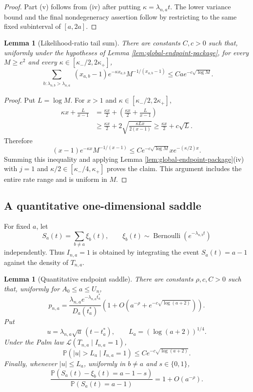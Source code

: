 \documentclass[11pt]{article}
\newtheorem{lemma}[theorem]{Lemma}
\theoremstyle{remark}
\newcommand{\Pp}{\mathbb P}
\begin{document}
\begin{proof}
Part (v) follows from (iv) after putting $\kappa=\lambda_{n,a}t$.  The lower
variance bound and the final nondegeneracy assertion follow by restricting to
the same fixed subinterval of $[a,2a]$.
\end{proof}

\begin{lemma}[Likelihood-ratio tail sum]\label{lem:global-likelihood-tail}
There are constants $C,c>0$ such that, uniformly under the hypotheses of Lemma
\ref{lem:global-endpoint-package}, for every $M\ge e^2$ and every
$\kappa\in[\kappa_-/2,2\kappa_+]$,
\[
\sum_{\substack{b:\lambda_{n,b}>\lambda_{n,a}}}
(x_{a,b}-1)e^{-\kappa x_{a,b}}
M^{-1/(x_{a,b}-1)}
\le Ca e^{-c\sqrt{\log M}}.
\]
\end{lemma}

\begin{proof}
Put $L=\log M$.  For $x>1$ and
$\kappa\in[\kappa_-/2,2\kappa_+]$,
\[
\begin{aligned}
        \kappa x+\frac{L}{x-1}
        &=\frac{\kappa x}{2}
          +\left(\frac{\kappa x}{2}+\frac{L}{x-1}\right)\\
        &\ge \frac{\kappa x}{2}
          +2\sqrt{\frac{\kappa Lx}{2(x-1)}}
        \ge \frac{\kappa x}{2}+c\sqrt L.
\end{aligned}
\]
Therefore
\[
        (x-1)e^{-\kappa x}M^{-1/(x-1)}
        \le C e^{-c\sqrt{\log M}}x e^{-(\kappa/2)x}.
\]
Summing this inequality and applying Lemma
\ref{lem:global-endpoint-package}(iv) with $j=1$ and
$\kappa/2\in[\kappa_-/4,\kappa_+]$ proves the claim.  This argument includes
the entire rate range and is uniform in $M$.
\end{proof}

\subsection{A quantitative one-dimensional saddle}

For fixed $a$, let
\[
        S_a(t)=\sum_{b\ne a}\xi_b(t),
        \qquad
        \xi_b(t)\sim\operatorname{Bernoulli}
        (e^{-\lambda_{n,b}t})
\]
independently.  Thus $I_{n,a}=1$ is obtained by integrating the event
$S_a(t)=a-1$ against the density of $T_{n,a}$.

\begin{lemma}[Quantitative endpoint saddle]\label{lem:global-one-saddle}
There are constants $\rho,c,C>0$ such that, uniformly for
$A_0\le a\le U_n$,
\[
        p_{n,a}
        =\frac{\lambda_{n,a}e^{-\lambda_{n,a}t_a^*}}
        {D_a(t_a^*)}
        \left(1+O\left(a^{-\rho}
        +e^{-c\sqrt{\log(a+2)}}\right)\right).
\]
Put
\[
        u=\lambda_{n,a}\sqrt a\,(t-t_a^*),
        \qquad
        L_a=(\log(a+2))^{1/4}.
\]
Under the Palm law $\mathcal L(T_{n,a}\mid I_{n,a}=1)$,
\[
        \Pp(|u|>L_a\mid I_{n,a}=1)
        \le Ce^{-c\sqrt{\log(a+2)}}.
\]
Finally, whenever $|u|\le L_a$, uniformly in $b\ne a$ and
$s\in\{0,1\}$,
\[
        \frac{
        \Pp(S_a(t)-\xi_b(t)=a-1-s)}
        {\Pp(S_a(t)=a-1)}
        =1+O(a^{-\rho}).
\]
\end{lemma}
\end{document}
